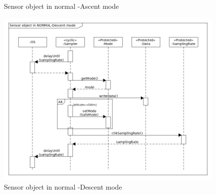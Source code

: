 \begin{landscape}
\begin{figure}[H]
    \caption{Sensor object in normal -Ascent mode}
    \label{sensorb}
\end{figure}
\begin{figure}[H]
    \centering
    \includegraphics[height=0.9\textwidth]{appendix/img/sensor-dia-seq-c.png}
    \caption{Sensor object in normal -Descent mode}
    \label{sensorc}
\end{figure}
\end{landscape}